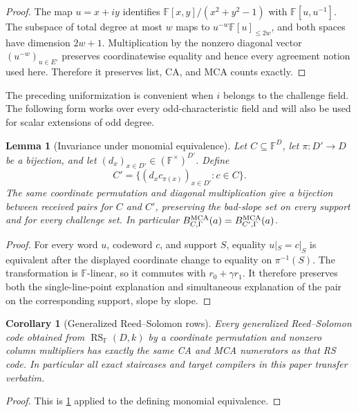 \documentclass[11pt,a4paper]{amsart}
\numberwithin{equation}{section}
\newtheorem{lemma}[lemma]{Lemma}
\newtheorem{corollary}[corollary]{Corollary}
\theoremstyle{remark}
\DeclareMathOperator{\RS}{RS}
\newcommand{\F}{\mathbb F}
\begin{document}
\begin{proof}
The map \(u=x+iy\) identifies \(\F[x,y]/(x^2+y^2-1)\) with \(\F[u,u^{-1}]\).  The subspace of total degree at most \(w\) maps to \(u^{-w}\F[u]_{\le2w}\), and both spaces have dimension \(2w+1\).  Multiplication by the nonzero diagonal vector \((u^{-w})_{u\in E'}\) preserves coordinatewise equality and hence every agreement notion used here.  Therefore it preserves list, CA, and MCA counts exactly.
\end{proof}

The preceding uniformization is convenient when \(i\) belongs to the
challenge field.  The following form works over every odd-characteristic
field and will also be used for scalar extensions of odd degree.

\begin{lemma}[Invariance under monomial equivalence]
\label{lem:monomial-mca-invariance}
Let \(C\subseteq\F^D\), let \(\pi:D'\to D\) be a bijection, and let
\((d_x)_{x\in D'}\in(\F^\times)^{D'}\).  Define
\[
 C'=\{(d_xc_{\pi(x)})_{x\in D'}:c\in C\}.
\]
The same coordinate permutation and diagonal multiplication give a
bijection between received pairs for \(C\) and \(C'\), preserving the
bad-slope set on every support and for every challenge set.  In
particular \(B_{C,\Gamma}^{\rm MCA}(a)=B_{C',\Gamma}^{\rm MCA}(a)\).
\end{lemma}

\begin{proof}
For every word \(u\), codeword \(c\), and support \(S\), equality
\(u|_S=c|_S\) is equivalent after the displayed coordinate change to
equality on \(\pi^{-1}(S)\).  The transformation is \(\F\)-linear, so it
commutes with \(r_0+\gamma r_1\).  It therefore preserves both the
single-line-point explanation and simultaneous explanation of the pair
on the corresponding support, slope by slope.
\end{proof}

\begin{corollary}[Generalized Reed--Solomon rows]
\label{cor:grs-transfer}
Every generalized Reed--Solomon code obtained from \(\RS_\F(D,k)\) by
a coordinate permutation and nonzero column multipliers has exactly the
same CA and MCA numerators as that RS code.  In particular all exact
staircases and target compilers in this paper transfer verbatim.
\end{corollary}

\begin{proof}
This is \cref{lem:monomial-mca-invariance} applied to the defining
monomial equivalence.
\end{proof}
\end{document}
